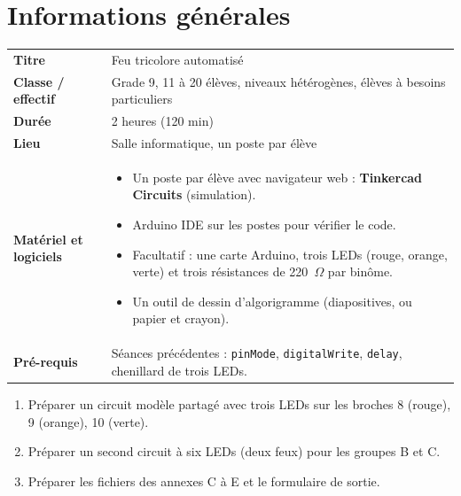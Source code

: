 \documentclass[11pt,a4paper]{article}
\begin{document}

\section{Informations générales}
\begin{tabularx}{\linewidth}{>{\bfseries}p{3.6cm}Y}
\toprule
Titre & Feu tricolore automatisé\\
Classe / effectif & Grade 9, 11 à 20 élèves, niveaux hétérogènes, élèves à besoins particuliers\\
Durée & 2 heures (120 min)\\
Lieu & Salle informatique, un poste par élève\\
Matériel et logiciels &
\begin{itemize}
 \item Un poste par élève avec navigateur web : \textbf{Tinkercad Circuits} (simulation).
 \item Arduino IDE sur les postes pour vérifier le code.
 \item Facultatif : une carte Arduino, trois LEDs (rouge, orange, verte) et trois résistances de 220~$\Omega$ par binôme.
 \item Un outil de dessin d'algorigramme (diapositives, ou papier et crayon).
\end{itemize}\\
Pré-requis &
Séances précédentes : \texttt{pinMode}, \texttt{digitalWrite}, \texttt{delay}, chenillard de trois LEDs.\\
\bottomrule
\end{tabularx}

\begin{astuce}
\begin{enumerate}
 \item Préparer un circuit modèle partagé avec trois LEDs sur les broches 8 (rouge), 9 (orange), 10 (verte).
 \item Préparer un second circuit à six LEDs (deux feux) pour les groupes B et C.
 \item Préparer les fichiers des annexes C à E et le formulaire de sortie.
\end{enumerate}
\end{astuce}

\end{document}
